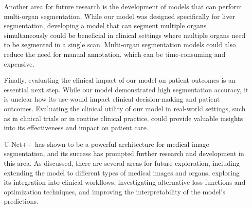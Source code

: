 \documentclass[conference]{IEEEtran}
\begin{document}
Another area for future research is the development of models that can perform multi-organ segmentation. While our model was designed specifically for liver segmentation, developing a model that can segment multiple organs simultaneously could be beneficial in clinical settings where multiple organs need to be segmented in a single scan. Multi-organ segmentation models could also reduce the need for manual annotation, which can be time-consuming and expensive.

Finally, evaluating the clinical impact of our model on patient outcomes is an essential next step. While our model demonstrated high segmentation accuracy, it is unclear how its use would impact clinical decision-making and patient outcomes. Evaluating the clinical utility of our model in real-world settings, such as in clinical trials or in routine clinical practice, could provide valuable insights into its effectiveness and impact on patient care.

 U-Net++ has shown to be a powerful architecture for medical image segmentation, and its success has prompted further research and development in this area. As discussed, there are several areas for future exploration, including extending the model to different types of medical images and organs, exploring its integration into clinical workflows, investigating alternative loss functions and optimization techniques, and improving the interpretability of the model's predictions. 
\end{document}
